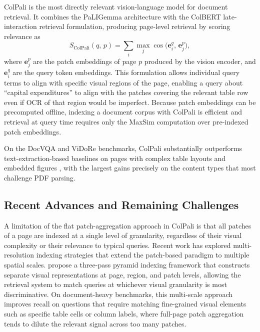 \documentclass[12pt,twoside,maitrise]{dms}
\theoremstyle{definition}
\numberwithin{equation}{section}
\numberwithin{table}{chapter}
\numberwithin{figure}{chapter}
\begin{document}
ColPali \citep{faysse2024colpali} is the most directly relevant vision-language model
for document retrieval. It combines the PaLIGemma architecture
\citep{beyer2024paligemma} with the ColBERT late-interaction retrieval formulation,
producing page-level retrieval by scoring relevance as
\begin{equation}
  S_{\text{ColPali}}(q,\, p) =
  \sum_{i} \max_{j} \cos\!\bigl(\mathbf{e}^q_i,\, \mathbf{e}^p_j\bigr),
  \label{eq:colpali_background}
\end{equation}
where $\mathbf{e}^p_j$ are the patch embeddings of page $p$ produced by the vision
encoder, and $\mathbf{e}^q_i$ are the query token embeddings. This formulation allows
individual query terms to align with specific visual regions of the page, enabling
a query about ``capital expenditures'' to align with the patches covering the relevant
table row even if OCR of that region would be imperfect. Because patch embeddings can
be precomputed offline, indexing a document corpus with ColPali is efficient and
retrieval at query time requires only the MaxSim computation over pre-indexed patch
embeddings.

On the DocVQA and ViDoRe benchmarks, ColPali substantially
outperforms text-extraction-based baselines on pages with complex table layouts and
embedded figures \citep{faysse2024colpali}, with the largest gains precisely on the content types that most
challenge PDF parsing.

\subsection{Recent Advances and Remaining Challenges}

A limitation of the flat patch-aggregation approach in ColPali is that all patches of a
page are indexed at a single level of granularity, regardless of their visual complexity
or their relevance to typical queries. Recent work has explored multi-resolution indexing
strategies that extend the patch-based paradigm to multiple spatial scales. \citet{fang2025pyramid}
propose a three-pass pyramid indexing framework that constructs separate visual
representations at page, region, and patch levels, allowing the retrieval system to match
queries at whichever visual granularity is most discriminative. On document-heavy
benchmarks, this multi-scale approach improves recall on questions that require matching
fine-grained visual elements such as specific table cells or column labels, where
full-page patch aggregation tends to dilute the relevant signal across too many patches.
\end{document}
